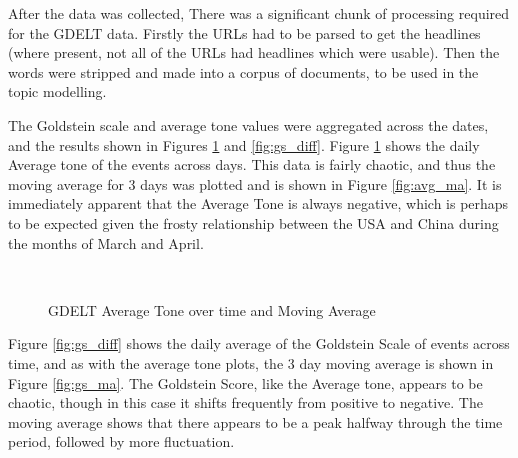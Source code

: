 After the data was collected, There was a significant chunk of processing required for the GDELT data. Firstly the URLs had to be parsed to get the headlines (where present, not all of the URLs had headlines which were usable). Then the words were stripped and made into a corpus of documents, to be used in the topic modelling. 

The Goldstein scale and average tone values were aggregated across the dates, and the results shown in Figures \ref{fig:avg_tone_diff} and \ref{fig:gs_diff}. Figure \ref{fig:avg_tone_diff} shows the daily Average tone of the events across days. This data is fairly chaotic, and thus the moving average for 3 days was plotted and is shown in Figure \ref{fig:avg_ma}. It is immediately apparent that the Average Tone is always negative, which is perhaps to be expected given the frosty relationship between the USA and China during the months of March and April. 
 
 \begin{figure}[H]
 	\centering
 	\\
 	\caption{GDELT Average Tone over time and Moving Average}
 	\label{fig:avg_tone_diff}
 \end{figure}
 
 Figure \ref{fig:gs_diff} shows the daily average of the Goldstein Scale of events across time, and as with the average tone plots, the 3 day moving average is shown in Figure \ref{fig:gs_ma}. The Goldstein Score, like the Average tone, appears to be chaotic, though in this case it shifts frequently from positive to negative. The moving average shows that there appears to be a peak halfway through the time period, followed by more fluctuation. 
 

